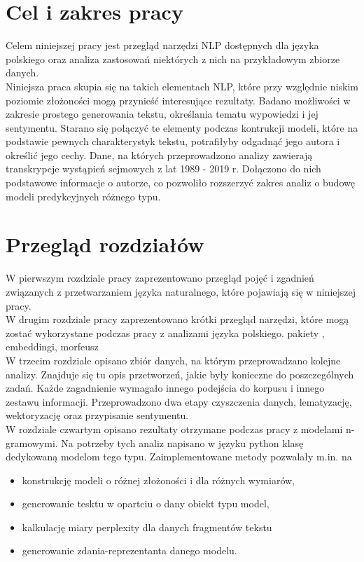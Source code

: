 \documentclass[a4paper,11pt,twoside]{report}
\theoremstyle{definition}
\begin{document}
\section{Cel i zakres pracy}\label{miss_vs_class}

Celem niniejszej pracy jest przegląd narzędzi NLP dostępnych dla języka polskiego oraz analiza zastosowań niektórych z nich na przykładowym zbiorze danych. \\
Niniejsza praca skupia się na takich elementach NLP, które przy względnie niskim poziomie złożoności mogą przynieść interesujące rezultaty. Badano możliwości w zakresie prostego generowania tekstu, określania tematu wypowiedzi i jej sentymentu. Starano się połączyć te elementy podczas kontrukcji modeli, które na podstawie pewnych charakterystyk tekstu, potrafiłyby odgadnąć jego autora i określić jego cechy. 
Dane, na których przeprowadzono analizy zawierają transkrypcje wystąpień sejmowych z lat 1989 - 2019 r. Dołączono do nich podstawowe informacje o autorze, co pozwoliło rozszerzyć zakres analiz o budowę modeli predykcyjnych różnego typu.

\section{Przegląd rozdziałów}
W pierwszym rozdziale pracy zaprezentowano przegląd pojęć i zgadnień związanych z przetwarzaniem języka naturalnego, które pojawiają się w niniejszej pracy. \\

W drugim rozdziale pracy zaprezentowano krótki przegląd narzędzi, które mogą zostać wykorzystane podczas pracy z analizami języka polskiego. pakiety , embeddingi, morfeusz \\

W trzecim rozdziale opisano zbiór danych, na którym przeprowadzano kolejne analizy. Znajduje się tu opis przetworzeń, jakie były konieczne do poszczególnych zadań. Każde zagadnienie wymagało innego podejścia do korpusu i innego zestawu informacji. Przeprowadzono dwa etapy czyszczenia danych, lematyzację, wektoryzację oraz przypisanie sentymentu. \\

W rozdziale czwartym opisano rezultaty otrzymane podczas pracy z modelami n-gramowymi. Na potrzeby tych analiz napisano w języku python klasę dedykowaną modelom tego typu. Zaimplementowane metody pozwalały m.in. na 
\begin{itemize}
\item konstrukcję modeli o różnej złożoności i dla różnych wymiarów,
\item generowanie tesktu w opartciu o dany obiekt typu model,
\item kalkulację miary perplexity dla danych fragmentów tekstu
\item generowanie zdania-reprezentanta danego modelu.
\end{itemize}
\end{document}
